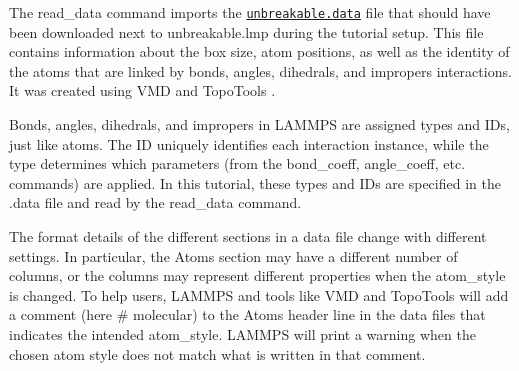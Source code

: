 \documentclass[9pt,tutorial]{livecoms}
\newcommand{\lmpcmd}[1]{\colorbox{listing}{\textcolor{command}{\small{#1}}}} %
\newcommand{\dwlcmd}[1]{\textcolor{download}{\texttt{#1}}} %
\newcommand{\filepath}{https://raw.githubusercontent.com/lammpstutorials/lammpstutorials-article/main/files/}
\begin{document}
The \lmpcmd{read\_data} command imports the
\href{\filepath tutorial2/unbreakable.data}{\dwlcmd{unbreakable.data}}
file that should have been downloaded next
to \lmpcmd{unbreakable.lmp} during the tutorial setup. This file
contains information about the box size, atom positions, as well as the
identity of the atoms that are
linked by \lmpcmd{bonds}, \lmpcmd{angles}, \lmpcmd{dihedrals}, and
\lmpcmd{impropers} interactions. It was created using VMD and TopoTools
\cite{kohlmeyer2017topotools}.

\begin{note}
  Bonds, angles, dihedrals, and impropers in LAMMPS are assigned types and IDs, just like atoms.
  The ID uniquely identifies each interaction instance, while the type determines which parameters
  (from the \lmpcmd{bond\_coeff}, \lmpcmd{angle\_coeff}, etc. commands) are applied.
  In this tutorial, these types and IDs are specified in the \lmpcmd{.data} file and
  read by the \lmpcmd{read\_data} command.
\end{note}

\begin{note}
  The format details of the
  different sections in a data file change with different settings.  In
  particular, the \lmpcmd{Atoms} section may have a different number of
  columns, or the columns may represent different properties when the
  \lmpcmd{atom\_style} is changed.  To help users, LAMMPS and tools like
  VMD and TopoTools will add a comment (here \lmpcmd{\# molecular}) to the
  \lmpcmd{Atoms} header line in the data files that indicates the intended
  \lmpcmd{atom\_style}.  LAMMPS will print a warning when the chosen atom
  style does not match what is written in that comment.
\end{note}
\end{document}
